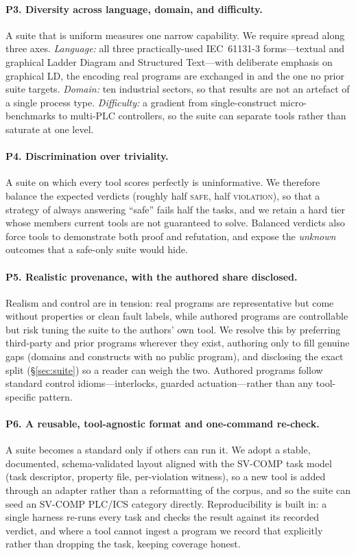 \paragraph{P3. Diversity across language, domain, and difficulty.}
A suite that is uniform measures one narrow capability. We require spread along three axes.
\emph{Language:} all three practically-used IEC~61131-3 forms---textual and graphical Ladder
Diagram and Structured Text---with deliberate emphasis on graphical LD, the encoding real
programs are exchanged in and the one no prior suite targets. \emph{Domain:} ten industrial
sectors, so that results are not an artefact of a single process type. \emph{Difficulty:} a
gradient from single-construct micro-benchmarks to multi-PLC controllers, so the suite can
separate tools rather than saturate at one level.

\paragraph{P4. Discrimination over triviality.}
A suite on which every tool scores perfectly is uninformative. We therefore balance the
expected verdicts (roughly half \textsc{safe}, half \textsc{violation}), so that a strategy
of always answering ``safe'' fails half the tasks, and we retain a hard tier whose members
current tools are not guaranteed to solve. Balanced verdicts also force tools to demonstrate
both proof and refutation, and expose the \emph{unknown} outcomes that a safe-only suite
would hide.

\paragraph{P5. Realistic provenance, with the authored share disclosed.}
Realism and control are in tension: real programs are representative but come without
properties or clean fault labels, while authored programs are controllable but risk tuning
the suite to the authors' own tool. We resolve this by preferring third-party and prior
programs wherever they exist, authoring only to fill genuine gaps (domains and constructs with
no public program), and disclosing the exact split (\S\ref{sec:suite}) so a reader can weigh
the two. Authored programs follow standard control idioms---interlocks, guarded actuation---rather
than any tool-specific pattern.

\paragraph{P6. A reusable, tool-agnostic format and one-command re-check.}
A suite becomes a standard only if others can run it. We adopt a stable, documented,
schema-validated layout aligned with the SV-COMP task model (task descriptor, property file,
per-violation witness), so a new tool is added through an adapter rather than a reformatting
of the corpus, and so the suite can seed an SV-COMP PLC/ICS category directly. Reproducibility
is built in: a single harness re-runs every task and checks the result against its recorded
verdict, and where a tool cannot ingest a program we record that explicitly rather than
dropping the task, keeping coverage honest.

